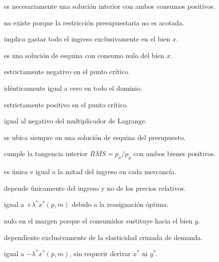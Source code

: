 \begin{opts}
    \item es necesariamente una solución interior con ambos consumos positivos.
    \item no existe porque la restricción presupuestaria no es acotada.
    \item implica gastar todo el ingreso exclusivamente en el bien $x$.
    \item es una solución de esquina con consumo nulo del bien $x$.
\end{opts}

\begin{opts}
    \item estrictamente negativo en el punto crítico.
    \item idénticamente igual a cero en todo el dominio.
    \item estrictamente positivo en el punto crítico.
    \item igual al negativo del multiplicador de Lagrange.
\end{opts}

\begin{opts}
    \item se ubica siempre en una solución de esquina del presupuesto.
    \item cumple la tangencia interior $RMS = p_x/p_y$ con ambos bienes positivos.
    \item es única e igual a la mitad del ingreso en cada mercancía.
    \item depende únicamente del ingreso y no de los precios relativos.
\end{opts}

\begin{opts}
    \item igual a $+\lambda^* x^*(p,m)$ debido a la reasignación óptima.
    \item nulo en el margen porque el consumidor sustituye hacia el bien $y$.
    \item dependiente exclusivamente de la elasticidad cruzada de demanda.
    \item igual a $-\lambda^* x^*(p,m)$, sin requerir derivar $x^*$ ni $y^*$.
\end{opts}

